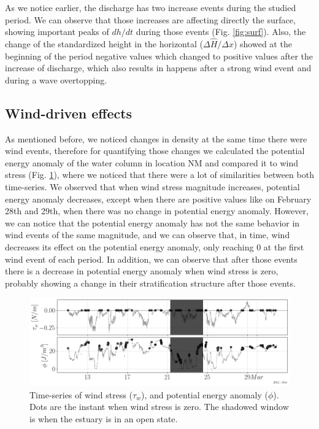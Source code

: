 \documentclass[tesis.tex]{subfiles}
\begin{document}
As we notice earlier, the discharge has two increase events during the studied period. We can observe that those increases are affecting directly the surface, showing important peaks of $dh/dt$ during those events (Fig. \ref{fig:surf}). Also, the change of the standardized height in the horizontal ($\Delta \hat{H}/\Delta x$) showed at the beginning of the period negative values which changed to positive values after the increase of discharge, which also results in happens after a strong wind event and during a wave overtopping.\\

\subsection{Wind-driven effects}

As mentioned before, we noticed changes in density at the same time there were wind events, therefore for quantifying those changes we calculated the potential energy anomaly of the water column in location NM and compared it to wind stress (Fig. \ref{fig:phi}), where we noticed that there were a lot of similarities between both time-series. We observed that when wind stress magnitude increases, potential energy anomaly decreases, except when there are positive values like on February 28th and 29th, when there was no change in potential energy anomaly. However, we can notice that the potential energy anomaly has not the same behavior in wind events of the same magnitude, and we can observe that, in time, wind decreases its effect on the potential energy anomaly, only reaching 0 at the first wind event of each period. In addition, we can observe that after those events there is a decrease in potential energy anomaly when wind stress is zero, probably showing a change in their stratification structure after those events.\\

\begin{figure}[h!]
    \centering
    \includegraphics[width=\textwidth]{Imagenes/phi.png}
    \caption{Time-series of wind stress ($\tau_w$), and potential energy anomaly ($\phi$). Dots are the instant when wind stress is zero. The shadowed window is when the estuary is in an open state.}
    \label{fig:phi}
\end{figure}
\end{document}
